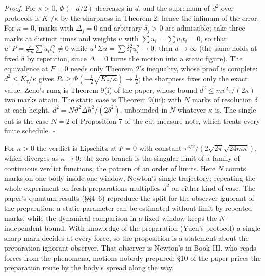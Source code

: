 \documentclass[11pt,a4paper]{article}
\begin{document}
\emph{Proof.} For \(\kappa>0\), \(\Phi(-d/2)\) decreases in \(d\), and
the supremum of \(d^2\) over protocols is \(K_\tau/\kappa\) by the
sharpness in Theorem 2; hence the infimum of the error. For
\(\kappa=0\), marks with \(\Delta_j=0\) and arbitrary \(\delta_j>0\) are
admissible; take three marks at distinct times and weights \(u\) with
\(\sum u_i=\sum u_it_i=0\), so that
\(u^{\mathsf T}P=\frac F{2m}\sum u_it_i^2\ne0\) while
\(u^{\mathsf T}\Sigma u=\sum\delta_i^2u_i^2\to0\); then \(d\to\infty\)
(the same holds at fixed \(\delta\) by repetition, since \(\Delta=0\)
turns the motion into a static figure). The equivalence at \(F=0\) needs
only Theorem 2's inequality, whose proof is complete:
\(d^2\le K_\tau/\kappa\) gives
\(P_*\ge\Phi(-\frac12\sqrt{K_\tau/\kappa})\to\frac12\); the sharpness
fixes only the exact value. Zeno's rung is Theorem 9(i) of the paper,
whose bound \(d^2\le mv^2\tau/(2\kappa)\) two marks attain. The static
case is Theorem 9(iii): with \(N\) marks of resolution \(\delta\) at
each height, \(d^2=N\vartheta^2\Delta h^2/(2\delta^2)\), unbounded in
\(N\) whatever \(\kappa\) is. The single cut is the case \(N=2\) of
Proposition 7 of the cut-measure note, which treats every finite
schedule. \(\square\)

For \(\kappa>0\) the verdict is Lipschitz at \(F=0\) with constant
\(\tau^{3/2}/(2\sqrt{2\pi}\sqrt{24m\kappa})\), which diverges as
\(\kappa\to0\): the zero branch is the singular limit of a family of
continuous verdict functions, the pattern of an order of limits. Here
\(N\) counts marks on one body inside one window, Newton's single
trajectory; repeating the whole experiment on fresh preparations
multiplies \(d^2\) on either kind of case. The paper's quantum results
(§§4--6) reproduce the split for the observer ignorant of the
preparation: a static parameter can be estimated without limit by
repeated marks, while the dynamical comparison in a fixed window keeps
the \(N\)-independent bound. With knowledge of the preparation (Yuen's
protocol) a single sharp mark decides at every force, so the proposition
is a statement about the preparation-ignorant observer. That observer is
Newton's in Book III, who reads forces from the phenomena, motions
nobody prepared; §10 of the paper prices the preparation route by the
body's spread along the way.
\end{document}
